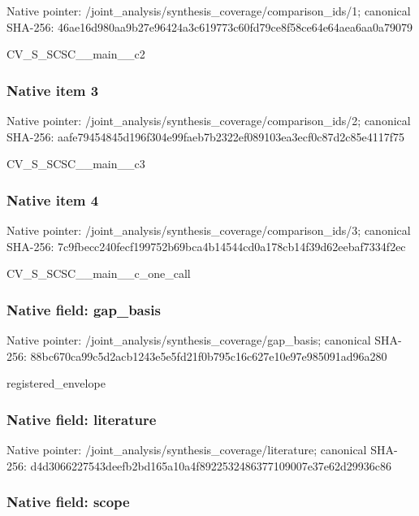 \documentclass[10pt,a4paper]{article}
\begin{document}
Native pointer: /joint\_analysis/synthesi\allowbreak{}s\_coverage/comparison\_id\allowbreak{}s/1; canonical SHA-256: 46ae16d980aa9b27e96424a3\allowbreak{}c619773c60fd79ce8f58ce64\allowbreak{}e64aea6aa0a79079


CV\_S\_SCSC\_\_main\_\_c2


\subsubsection{Native item 3}


Native pointer: /joint\_analysis/synthesi\allowbreak{}s\_coverage/comparison\_id\allowbreak{}s/2; canonical SHA-256: aafe79454845d196f304e99f\allowbreak{}aeb7b2322ef089103ea3ecf0\allowbreak{}c87d2c85e4117f75


CV\_S\_SCSC\_\_main\_\_c3


\subsubsection{Native item 4}


Native pointer: /joint\_analysis/synthesi\allowbreak{}s\_coverage/comparison\_id\allowbreak{}s/3; canonical SHA-256: 7c9fbecc240fecf199752b69\allowbreak{}bca4b14544cd0a178cb14f39\allowbreak{}d62eebaf7334f2ec


CV\_S\_SCSC\_\_main\_\_c\_one\_call


\subsubsection{Native field: gap\_basis}


Native pointer: /joint\_analysis/synthesi\allowbreak{}s\_coverage/gap\_basis; canonical SHA-256: 88bc670ca99c5d2acb1243e5\allowbreak{}e5fd21f0b795c16c627e10e9\allowbreak{}7e985091ad96a280


registered\_envelope


\subsubsection{Native field: literature}


Native pointer: /joint\_analysis/synthesi\allowbreak{}s\_coverage/literature; canonical SHA-256: d4d3066227543deefb2bd165\allowbreak{}a10a4f892253248637710900\allowbreak{}7e37e62d29936c86



\subsubsection{Native field: scope}
\end{document}
